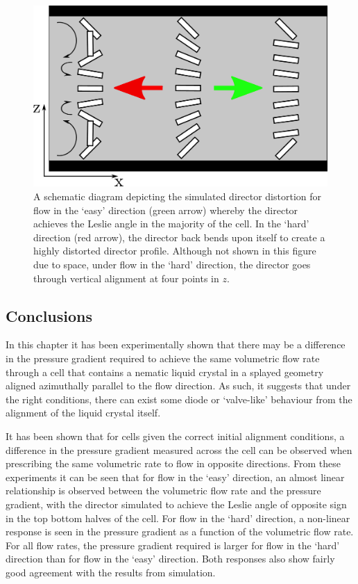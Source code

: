 \begin{figure}
\begin{center}
\includegraphics{Figures/Diode/easy_hard}
\end{center}
\caption[Schematic diagram of the simulated director profiles for flow in the `easy' and `hard' directions]{\label{fig:easy_hard}A schematic diagram depicting the simulated director distortion for flow in the `easy' direction (green arrow) whereby the director achieves the Leslie angle in the majority of the cell. In the `hard' direction (red arrow), the director back bends upon itself to create a highly distorted director profile. Although not shown in this figure due to space, under flow in the `hard' direction, the director goes through vertical alignment at four points in $z$.}
\end{figure}

\subsection{Conclusions}
In this chapter it has been experimentally shown that there may be a difference in the pressure gradient required to achieve the same volumetric flow rate through a cell that contains a nematic liquid crystal in a splayed geometry aligned azimuthally parallel to the flow direction. As such, it suggests that under the right conditions, there can exist some diode or `valve-like' behaviour from the alignment of the liquid crystal itself.

It has been shown that for cells given the correct initial alignment conditions, a difference in the pressure gradient measured across the cell can be observed when prescribing the same volumetric rate to flow in opposite directions. From these experiments it can be seen that for flow in the `easy' direction, an almost linear relationship is observed between the volumetric flow rate and the pressure gradient, with the director simulated to achieve the Leslie angle of opposite sign in the top bottom halves of the cell. For flow in the `hard' direction, a non-linear response is seen in the pressure gradient as a function of the volumetric flow rate. For all flow rates, the pressure gradient required is larger for flow in the `hard' direction than for flow in the `easy' direction. Both responses also show fairly good agreement with the results from simulation.

